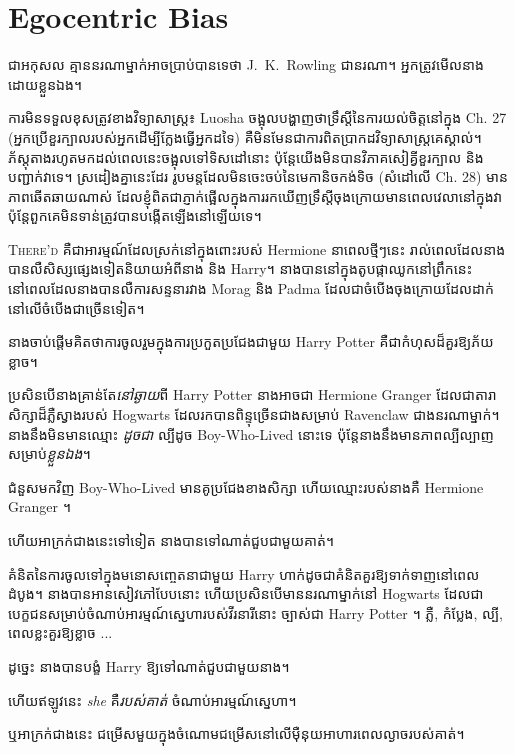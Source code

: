 \chapter{Egocentric Bias}

\begin{chapterOpeningAuthorNote}
ជាអកុសល គ្មាននរណាម្នាក់អាចប្រាប់បានទេថា J.~K.~Rowling ជានរណា។ អ្នកត្រូវមើលនាងដោយខ្លួនឯង។

ការមិនទទួលខុសត្រូវខាងវិទ្យាសាស្ត្រ៖ Luosha ចង្អុលបង្ហាញថាទ្រឹស្តីនៃការយល់ចិត្តនៅក្នុង Ch. 27 (អ្នក​ប្រើ​ខួរក្បាល​របស់​អ្នក​ដើម្បី​ក្លែង​ធ្វើ​អ្នក​ដទៃ) គឺ​មិន​មែន​ជា​ការ​ពិត​ប្រាកដ​វិទ្យា​សា​ស្រ្ត​គេ​ស្គាល់​។ ភ័ស្តុតាង​រហូត​មក​ដល់​ពេល​នេះ​ចង្អុល​ទៅ​ទិស​ដៅ​នោះ ប៉ុន្តែ​យើង​មិន​បាន​វិភាគ​សៀគ្វី​ខួរក្បាល និង​បញ្ជាក់​វា​ទេ។ ស្រដៀងគ្នានេះដែរ រូបមន្តដែលមិនចេះចប់នៃមេកានិចកង់ទិច (សំដៅលើ Ch. 28) មានភាពឆើតឆាយណាស់ ដែលខ្ញុំពិតជាភ្ញាក់ផ្អើលក្នុងការរកឃើញទ្រឹស្តីចុងក្រោយមានពេលវេលានៅក្នុងវា ប៉ុន្តែពួកគេមិនទាន់ត្រូវបានបង្កើតឡើងនៅឡើយទេ។
\end{chapterOpeningAuthorNote}

\lettrine{T}{here'd} គឺជាអារម្មណ៍ដែលស្រក់នៅក្នុងពោះរបស់ Hermione នាពេលថ្មីៗនេះ រាល់ពេលដែលនាងបានលឺសិស្សផ្សេងទៀតនិយាយអំពីនាង និង Harry។ នាងបាននៅក្នុងតូបផ្កាឈូកនៅព្រឹកនេះ នៅពេលដែលនាងបានលឺការសន្ទនារវាង Morag និង Padma ដែលជាចំបើងចុងក្រោយដែលដាក់នៅលើចំបើងជាច្រើនទៀត។

នាងចាប់ផ្តើមគិតថាការចូលរួមក្នុងការប្រកួតប្រជែងជាមួយ Harry Potter គឺជាកំហុសដ៏គួរឱ្យភ័យខ្លាច។

ប្រសិនបើនាងគ្រាន់តែ\emph{នៅឆ្ងាយ}ពី Harry Potter នាងអាចជា Hermione Granger ដែលជាតារាសិក្សាដ៏ភ្លឺស្វាងរបស់ Hogwarts ដែលរកបានពិន្ទុច្រើនជាងសម្រាប់ Ravenclaw ជាងនរណាម្នាក់។ នាងនឹងមិនមានឈ្មោះ \emph{ដូចជា} ល្បីដូច Boy-Who-Lived នោះទេ ប៉ុន្តែនាងនឹងមានភាពល្បីល្បាញសម្រាប់\emph{ខ្លួនឯង}។

ជំនួសមកវិញ Boy-Who-Lived មានគូប្រជែងខាងសិក្សា ហើយឈ្មោះរបស់នាងគឺ Hermione Granger ។

ហើយអាក្រក់ជាងនេះទៅទៀត នាងបានទៅណាត់ជួបជាមួយគាត់។

គំនិតនៃការចូលទៅក្នុងមនោសញ្ចេតនាជាមួយ Harry ហាក់ដូចជាគំនិតគួរឱ្យទាក់ទាញនៅពេលដំបូង។ នាងបានអានសៀវភៅបែបនោះ ហើយប្រសិនបើមាននរណាម្នាក់នៅ Hogwarts ដែលជាបេក្ខជនសម្រាប់ចំណាប់អារម្មណ៍ស្នេហារបស់វីរនារីនោះ ច្បាស់ជា Harry Potter ។ ភ្លឺ, កំប្លែង, ល្បី, ពេលខ្លះគួរឱ្យខ្លាច ...

ដូច្នេះ នាង​បាន​បង្ខំ Harry ឱ្យ​ទៅ​ណាត់​ជួប​ជាមួយ​នាង។

ហើយឥឡូវនេះ \emph{she} គឺ\emph{របស់គាត់} ចំណាប់អារម្មណ៍ស្នេហា។

ឬអាក្រក់ជាងនេះ ជម្រើសមួយក្នុងចំណោមជម្រើសនៅលើម៉ឺនុយអាហារពេលល្ងាចរបស់គាត់។

